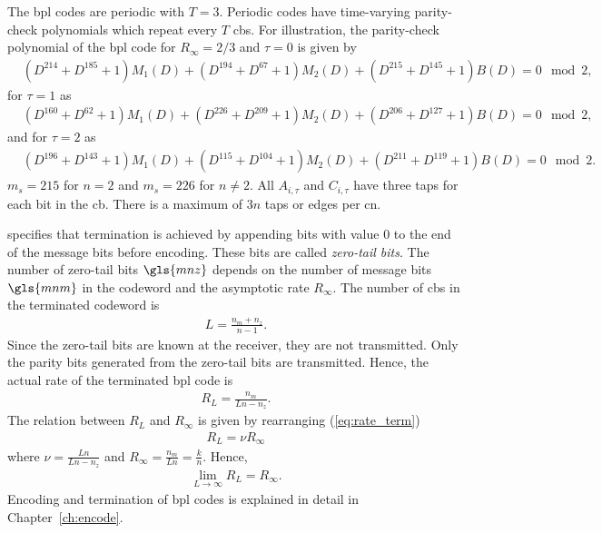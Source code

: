 The \gls{bpl} codes are periodic with $T=3$. Periodic codes have time-varying parity-check polynomials which repeat every $T$ \glspl{cb}. For illustration, the parity-check polynomial of the \gls{bpl} code for $R_\infty=2/3$ and $\tau=0$ is given by
\begin{align}
&(D^{214}+D^{185}+1)M_1(D)+(D^{194}+D^{67}+1)M_2(D)+(D^{215}+D^{145}+1)B(D)=0\mod 2,
\end{align}
for $\tau=1$ as
\begin{align}
&(D^{160}+D^{62}+1)M_1(D)+(D^{226}+D^{209}+1)M_2(D)+(D^{206}+D^{127}+1)B(D)=0\mod 2,
\end{align}
and for $\tau=2$ as
\begin{align}
&(D^{196}+D^{143}+1)M_1(D)+(D^{115}+D^{104}+1)M_2(D)+(D^{211}+D^{119}+1)B(D)=0\mod 2.
\end{align}
$m_s=215$ for $n=2$ and $m_s=226$ for $n\neq2$. All $A_{i,\tau}$ and $C_{i,\tau}$ have three taps for each bit in the \gls{cb}. There is a maximum of $3n$ taps or edges per \gls{cn}.

\cite{Bpl} specifies that termination is achieved by appending bits with value $0$ to the end of the message bits before encoding. These bits are called \emph{zero-tail bits}. The number of zero-tail bits $\gls{mnz}$ depends on the number of message bits $\gls{mnm}$ in the codeword and the asymptotic rate $R_\infty$. The number of \glspl{cb} in the terminated codeword is \begin{align}L=\frac{n_m+n_z}{n-1}.\end{align} Since the zero-tail bits are known at the receiver, they are not transmitted. Only the parity bits generated from the zero-tail bits are transmitted. Hence, the actual rate of the terminated \gls{bpl} code is
\begin{align}\label{eq:rate_term}
R_L=\frac{n_m}{Ln-n_z}.
\end{align}
The relation between $R_L$ and $R_\infty$ is given by rearranging (\ref{eq:rate_term})
\begin{align}
R_L=\nu R_\infty
\end{align}
where $\nu=\frac{Ln}{Ln-n_z}$ and $R_\infty=\frac{n_m}{Ln}=\frac{k}{n}$. Hence,
\begin{align}
\lim_{L\to\infty}R_L=R_\infty.
\end{align}
Encoding and termination of \gls{bpl} codes is explained in detail in Chapter~\ref{ch:encode}.

